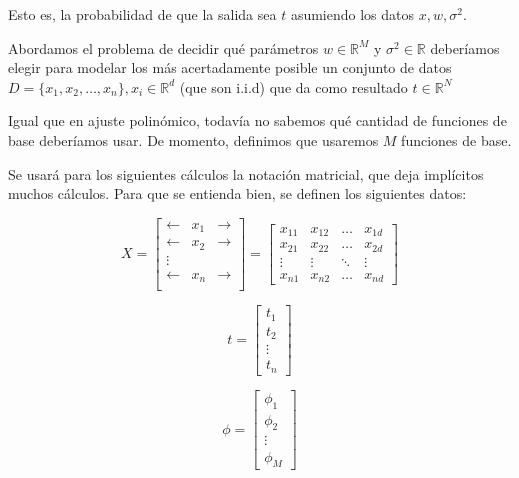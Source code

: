 Esto es, la probabilidad de que la salida sea $t$ asumiendo los datos $x, w, \sigma^2$.

Abordamos el problema de decidir qué parámetros $w \in \mathbb{R}^M$ y $\sigma^2 \in \mathbb{R}$ deberíamos elegir para modelar los más acertadamente posible un conjunto de datos $D = \{x_1, x_2, \dots, x_n\}, x_i \in \mathbb{R}^d$ (que son i.i.d)
que da como resultado $t \in \mathbb{R}^N$

Igual que en ajuste polinómico, todavía no sabemos qué cantidad de funciones de base deberíamos usar. De momento, definimos que usaremos $M$ funciones de base.

Se usará para los siguientes cálculos la notación matricial, que deja implícitos muchos cálculos. Para que se entienda bien, se definen los siguientes datos:


\begin{equation*}
X =
\begin{bmatrix}
\leftarrow & x_1 & \rightarrow \\
\leftarrow & x_2 & \rightarrow \\
\vdots \\
\leftarrow & x_n & \rightarrow \\
\end{bmatrix}
=
\begin{bmatrix}
x_{11} & x_{12} & \dots & x_{1d} \\
x_{21} & x_{22} & \dots & x_{2d} \\
\vdots & \vdots & \ddots & \vdots \\
x_{n1} & x_{n2} & \dots & x_{nd}
\end{bmatrix}
\end{equation*}



\begin{equation*}
t =
\begin{bmatrix}
t_1 \\
t_2 \\
\vdots \\
t_n
\end{bmatrix}
\end{equation*}

\begin{equation*}
\phi =
\begin{bmatrix}
\phi_1 \\
\phi_2 \\
\vdots \\
\phi_M
\end{bmatrix}
\end{equation*}



